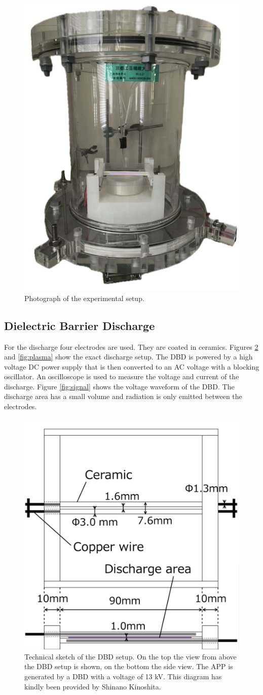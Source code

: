 \begin{figure}
    \centering
    \includegraphics[width=.5\textwidth]{images/Setup_photo.jpeg}
    \caption[Photograph of the setup]{Photograph of the experimental setup.}
    \label{fig:photo}
\end{figure}

\subsection{Dielectric Barrier Discharge}
\label{sec:dbd}
For the discharge four electrodes are used. They are coated in ceramics. Figures \ref{fig:dbd} and \ref{fig:plasma} show the exact discharge setup. The DBD is powered by a high voltage DC power supply that is then converted to an AC voltage with a blocking oscillator. An oscilloscope is used to measure the voltage and current of the discharge. Figure \ref{fig:signal} shows the voltage waveform of the DBD. The discharge area has a small volume and radiation is only emitted between the electrodes. 
\begin{figure}
    \centering
    \includegraphics[width=.65\textwidth]{images/APP_setup.png}
    \caption[Technical sketch of the DBD setup]{Technical sketch of the DBD setup. On the top the view from above the DBD setup is shown, on the bottom the side view. The APP is generated by a DBD with a voltage of 13 kV. This diagram has kindly been provided by Shinano Kinoshita.}
    \label{fig:dbd}
\end{figure}

